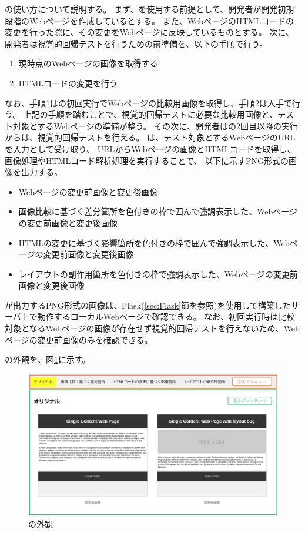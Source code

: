 \toolName の使い方について説明する。
まず、\toolName を使用する前提として、開発者が開発初期段階のWebページを作成しているとする。
また、WebページのHTMLコードの変更を行った際に、その変更をWebページに反映しているものとする。
次に、開発者は視覚的回帰テストを行うための前準備を、以下の手順で行う。
\begin{enumerate}
    \item 現時点のWebページの画像を取得する
    \item HTMLコードの変更を行う
\end{enumerate}
なお、手順1は\toolName の初回実行でWebページの比較用画像を取得し、手順2は人手で行う。
上記の手順を踏むことで、視覚的回帰テストに必要な比較用画像と、テスト対象とするWebページの準備が整う。
その次に、開発者は\toolName の2回目以降の実行からは、視覚的回帰テストを行える。
\toolName は、テスト対象とするWebページのURLを入力として受け取り、
URLからWebページの画像とHTMLコードを取得し、
画像処理やHTMLコード解析処理を実行することで、
以下に示すPNG形式の画像を出力する。
\begin{itemize}
    \item Webページの変更前画像と変更後画像
    \item 画像比較に基づく差分箇所を色付きの枠で囲んで強調表示した、Webページの変更前画像と変更後画像
    \item HTMLの変更に基づく影響箇所を色付きの枠で囲んで強調表示した、Webページの変更前画像と変更後画像
    \item レイアウトの副作用箇所を色付きの枠で強調表示した、Webページの変更前画像と変更後画像
\end{itemize}
\toolName が出力するPNG形式の画像は、Flask(\ref{sec:Flask}節を参照)を使用して構築したサーバ上で動作するローカルWebページで確認できる。
なお、\toolName 初回実行時は比較対象となるWebページの画像が存在せず視覚的回帰テストを行えないため、Webページの変更前画像のみを確認できる。
\par
\toolName の外観を、図\ref{fig: Appearance}に示す。
\begin{figure}[tp]
    \begin{center}
        \includegraphics[width=1.0\columnwidth]{image/3_Appearance.png}
        \caption{\toolName の外観}
        \label{fig: Appearance}
    \end{center}
\end{figure}
